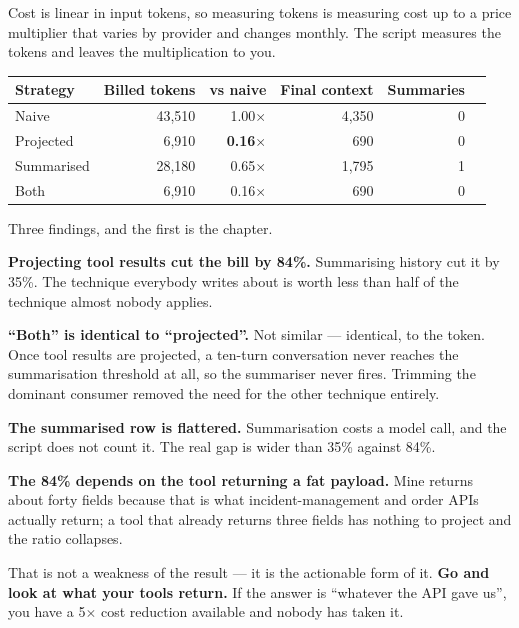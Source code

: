 Cost is linear in input tokens, so measuring tokens is measuring cost up to a
price multiplier that varies by provider and changes monthly. The script measures
the tokens and leaves the multiplication to you.

\begin{center}
\small
\begin{tabularx}{\linewidth}{@{}lrrrrX@{}}
\toprule
\textbf{Strategy} & \textbf{Billed tokens} & \textbf{vs naive} & \textbf{Final context} & \textbf{Summaries} \\
\midrule
Naive & 43,510 & 1.00$\times$ & 4,350 & 0 \\
Projected & 6,910 & \textbf{0.16}$\times$ & 690 & 0 \\
Summarised & 28,180 & 0.65$\times$ & 1,795 & 1 \\
Both & 6,910 & 0.16$\times$ & 690 & 0 \\
\bottomrule
\end{tabularx}
\end{center}

Three findings, and the first is the chapter.

\textbf{Projecting tool results cut the bill by 84\%.} Summarising history cut it
by 35\%. The technique everybody writes about is worth less than half of the
technique almost nobody applies.

\textbf{``Both'' is identical to ``projected''.} Not similar --- identical, to
the token. Once tool results are projected, a ten-turn conversation never reaches
the summarisation threshold at all, so the summariser never fires. Trimming the
dominant consumer removed the need for the other technique entirely.

\textbf{The summarised row is flattered.} Summarisation costs a model call, and
the script does not count it. The real gap is wider than 35\% against 84\%.


\begin{warning}
\textbf{The 84\% depends on the tool returning a fat payload.} Mine returns about
forty fields because that is what incident-management and order APIs actually
return; a tool that already returns three fields has nothing to project and the
ratio collapses.

That is not a weakness of the result --- it is the actionable form of it.
\textbf{Go and look at what your tools return.} If the answer is ``whatever the
API gave us'', you have a 5$\times$ cost reduction available and nobody has taken
it.
\end{warning}

